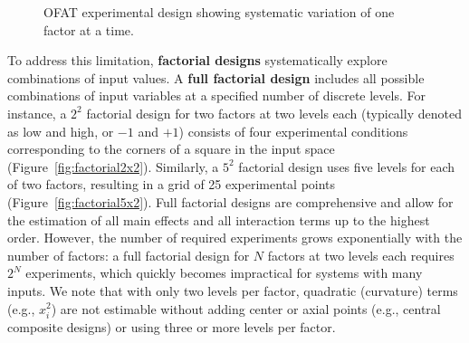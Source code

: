 \begin{figure}[H]
    \centering
    \caption{OFAT experimental design showing systematic variation of one factor at a time.}
    \label{fig:ofat}
\end{figure}

To address this limitation, \textbf{factorial designs} systematically explore combinations of input values. A \textbf{full factorial design} includes all possible combinations of input variables at a specified number of discrete levels. For instance, a $2^2$ factorial design for two factors at two levels each (typically denoted as low and high, or $-1$ and $+1$) consists of four experimental conditions corresponding to the corners of a square in the input space (Figure~\ref{fig:factorial2x2}). Similarly, a $5^2$ factorial design uses five levels for each of two factors, resulting in a grid of 25 experimental points (Figure~\ref{fig:factorial5x2}). Full factorial designs are comprehensive and allow for the estimation of all main effects and all interaction terms up to the highest order. However, the number of required experiments grows exponentially with the number of factors: a full factorial design for $N$ factors at two levels each requires $2^N$ experiments, which quickly becomes impractical for systems with many inputs. We note that with only two levels per factor, quadratic (curvature) terms (e.g., $x_i^2$) are not estimable without adding center or axial points (e.g., central composite designs) or using three or more levels per factor.

